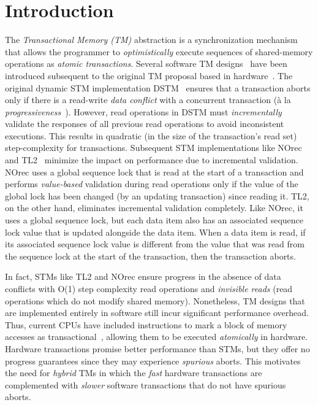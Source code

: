 \section{Introduction}
\label{sec:intro}
%
%
The \emph{Transactional Memory (TM)} abstraction is a synchronization mechanism 
that allows the programmer to \emph{optimistically} execute sequences of shared-memory
operations as \emph{atomic transactions}.
Several software TM designs~\cite{norec, ST95,HLM+03,fraser} have been introduced subsequent to the original TM proposal based in
hardware~\cite{HM93}. 
The original dynamic STM implementation DSTM~\cite{HLM+03} ensures that a transaction aborts only if there is a read-write \emph{data conflict} with a concurrent
transaction (\`a la \emph{progressiveness}~\cite{tm-book}). However, read operations in DSTM must \emph{incrementally} validate
the responses of all previous read operations to avoid inconsistent executions. 
This results in quadratic  (in the size of the transaction's read
set) step-complexity for transactions. Subsequent STM 
implementations like NOrec~\cite{norec} and TL2~\cite{DSS06}
minimize the impact on performance due to incremental validation.
NOrec uses a global sequence lock that is read at the start of a transaction and performs \emph{value-based}
validation during read operations only if the value of the global lock has been changed (by an updating transaction) 
since reading it.
TL2, on the other hand, eliminates incremental validation completely.
Like NOrec, it uses a global sequence lock, but each data item also 
has an associated sequence lock value that is updated alongside the data item.
When a data item is read, if its associated sequence lock value is different 
from the value that was read from the sequence lock at the start of the transaction, then the transaction aborts.

In fact, STMs like TL2 and NOrec ensure progress in the absence of data conflicts with 
O(1) step complexity read operations and \emph{invisible reads} (read operations which 
do not modify shared memory).
Nonetheless, TM designs that are implemented entirely in software still incur significant performance overhead.
Thus, current CPUs have included instructions to mark a block of memory accesses as transactional~\cite{Rei12, asf, bluegene}, allowing them to be executed \emph{atomically} in hardware.
Hardware transactions promise better performance than STMs, but they offer no progress guarantees 
since they may experience \emph{spurious} aborts. This motivates the need for
\emph{hybrid} TMs in which the \emph{fast} hardware transactions are 
complemented with \emph{slower} software transactions that do not have spurious aborts.

